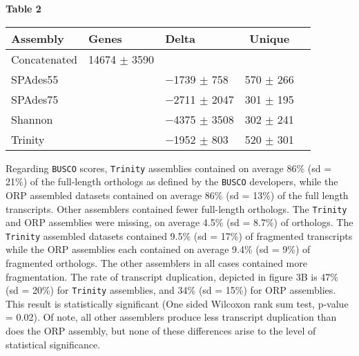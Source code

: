 \documentclass[10pt,letterpaper]{article}
\begin{document}
\begin{center}
\textbf{\hypertarget{Table 2}{Table 2}} \\
\begin{tabular}{l l l c c }
\textbf{Assembly} & \textbf{Genes} & \textbf{Delta} & \textbf{Unique}   \\ \hline
Concatenated & 14674 $\pm$ 3590 &  &  \\ \hline
SPAdes55 &  & $-$1739 $\pm$ 758  & 570 $\pm$ 266  \\ \hline
SPAdes75 &  & $-$2711 $\pm$ 2047  & 301 $\pm$ 195  \\ \hline
Shannon &  & $-$4375 $\pm$ 3508  & 302 $\pm$ 241  \\ \hline
Trinity &  & $-$1952 $\pm$ 803  & 520 $\pm$ 301  \\ \hline


\end{tabular}
\end{center}
\begin{quote}
\end{quote}

Regarding \texttt{BUSCO} scores, \texttt{Trinity} assemblies contained on average 86\% (sd = 21\%) of the full-length orthologs as defined by the \texttt{BUSCO} developers, while the ORP assembled datasets contained on average 86\% (sd = 13\%) of the full length transcripts. Other assemblers contained fewer full-length orthologs. The \texttt{Trinity} and ORP assemblies were missing, on average 4.5\% (sd = 8.7\%) of orthologs. The \texttt{Trinity} assembled datasets contained 9.5\% (sd = 17\%) of fragmented transcripts while the ORP assemblies each contained on average 9.4\% (sd = 9\%) of fragmented orthologs. The other assemblers in all cases contained more fragmentation. The rate of transcript duplication, depicted in figure 3B is 47\% (sd = 20\%) for \texttt{Trinity} assemblies, and 34\% (sd = 15\%) for ORP assemblies.  This result is statistically significant (One sided Wilcoxon rank sum test, p-value = 0.02). Of note, all other assemblers produce less transcript duplication than does the ORP assembly, but none of these differences arise to the level of statistical significance. 
\end{document}
